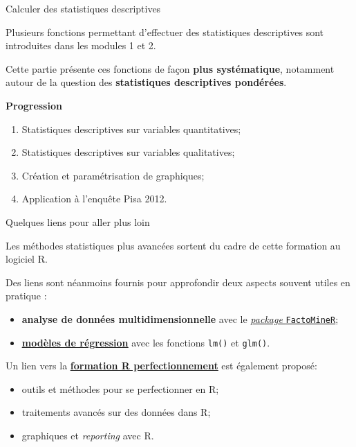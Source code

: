 \documentclass[12pt,ignorenonframetext,]{beamer}
\providecommand{\tightlist}{%
  \setlength{\itemsep}{0pt}\setlength{\parskip}{0pt}}
\newcommand{\strong}[1]{\textbf{\textcolor{redInsee}{#1}}}
\newcommand{\link}[1]{\textcolor{redInsee}{\underline{#1}}}
\begin{document}
\begin{frame}{Calculer des statistiques descriptives}
\protect\hypertarget{calculer-des-statistiques-descriptives}{}

Plusieurs fonctions permettant d’effectuer des statistiques descriptives
sont introduites dans les modules 1 et 2.

\pause Cette partie présente ces fonctions de façon \textbf{plus
systématique}, notamment autour de la question des \textbf{statistiques
descriptives pondérées}.

\bigskip \pause \strong{Progression}

\begin{enumerate}
[1.]
\item
  Statistiques descriptives sur variables quantitatives;
\item
  Statistiques descriptives sur variables qualitatives;
\item
  Création et paramétrisation de graphiques;
\item
  \pause Application à l’enquête Pisa 2012.
\end{enumerate}

\end{frame}

\begin{frame}[fragile]{Quelques liens pour aller plus loin}
\protect\hypertarget{quelques-liens-pour-aller-plus-loin}{}

Les méthodes statistiques plus avancées sortent du cadre de cette
formation au logiciel R.

\pause Des liens sont néanmoins fournis pour approfondir deux aspects
souvent utiles en pratique :

\begin{itemize}
\tightlist
\item
  \textbf{analyse de données multidimensionnelle} avec le
  \href{https://CRAN.R-project.org/package=FactoMineR}{\link{\textit{package} \texttt{FactoMineR}}};
\item
  \href{http://teaching.slmc.fr/mqs2/index.html}{\link{\textbf{modèles de régression}}}
  avec les fonctions \texttt{lm()} et \texttt{glm()}.
\end{itemize}

\bigskip \pause Un lien vers la
\href{http://teaching.slmc.fr/perf/index.html}{\textbf{\link{formation R perfectionnement}}}
est également proposé:

\begin{itemize}
\tightlist
\item
  outils et méthodes pour se perfectionner en R;
\item
  traitements avancés sur des données dans R;
\item
  graphiques et \emph{reporting} avec R.
\end{itemize}

\end{frame}
\end{document}

